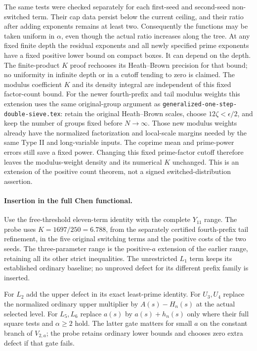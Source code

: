 \documentclass[11pt]{article}
\begin{document}
The same tests were checked separately for each first-seed and
second-seed non-switched term. Their cap data persist below the
current ceiling, and their ratio after adding exponents remains
at least two. Consequently the functions may be taken uniform in
$\alpha$, even though the actual ratio increases along the tree.
At any fixed finite depth the residual exponents and all newly
specified prime exponents have a fixed positive lower bound on
compact boxes. It can depend on the depth. The finite-product $K$
proof rechooses its Heath--Brown precision for that bound; no
uniformity in infinite depth or in a cutoff tending to zero is
claimed. The modulus coefficient $K$ and its density integral are
independent of this fixed factor-count bound.
For the newer fourth-prefix and tail modulus weights this extension
uses the same original-group argument as
\texttt{generalized-one-step-double-sieve.tex}: retain the original
Heath--Brown scales, choose $12\zeta<\epsilon/2$, and keep the number
of groups fixed before $N\to\infty$. Those new modulus weights
already have the normalized factorization and local-scale margins
needed by the same Type II and long-variable inputs. The coprime
mean and prime-power errors still save a fixed power. Changing this
fixed prime-factor cutoff therefore leaves the modulus-weight density
and its numerical $K$ unchanged. This is an extension of the positive
count theorem, not a signed switched-distribution assertion.

\paragraph{Insertion in the full Chen functional.}
Use the free-threshold eleven-term identity with the complete
$Y_{11}$ range. The probe uses $K=1697/250=6.788$, from the separately
certified fourth-prefix tail refinement, in the five original
switching terms and the positive costs of the two seeds.
The three-parameter range is the positive-$a$ extension of the
earlier range, retaining all its other strict inequalities.
The unrestricted $L_1$ term keeps its established ordinary baseline;
no unproved defect for its different prefix family is inserted.

For $L_2$ add the upper defect in its exact least-prime identity.
For $U_3,U_4$ replace the normalized ordinary upper multiplier by
$A(s)-H_n(s)$ at the actual selected level. For $L_5,L_6$ replace
$a(s)$ by $a(s)+h_n(s)$ only where their full square tests and
$\alpha\ge2$ hold. The latter gate matters for small $a$ on the
constant branch of $V_{2,a}$; the probe retains ordinary lower
bounds and chooses zero extra defect if that gate fails.
\end{document}
